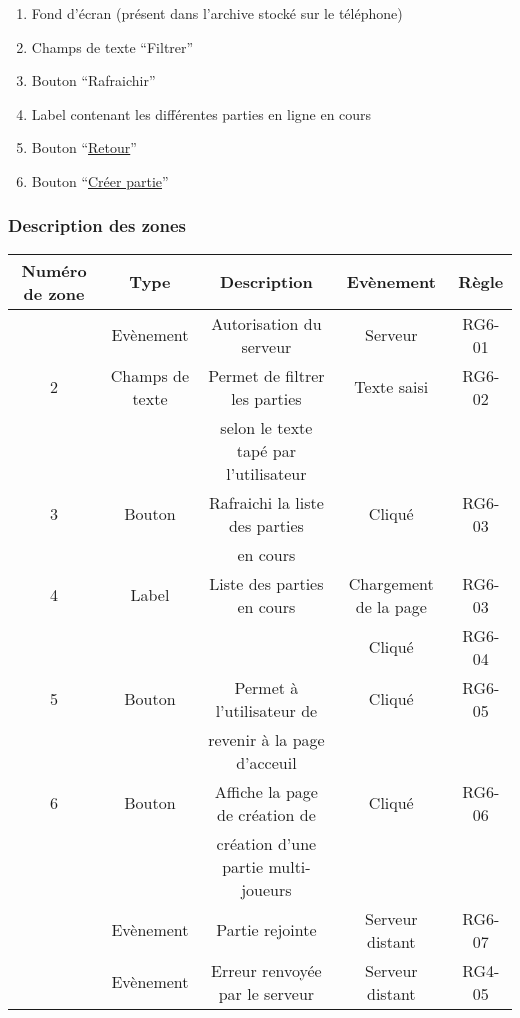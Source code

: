 \documentclass{report}
\begin{document}
		\begin{enumerate}
		  \item Fond d'écran (présent dans l'archive stocké sur le téléphone)
		  \item Champs de texte ``Filtrer''
		  \item Bouton ``Rafraichir''
		  \item Label contenant les différentes parties en ligne en cours
		  \item Bouton ``\hyperlink{Accueil}{Retour}''
		  \item Bouton ``\hyperlink{Creer partie multi-joueurs}{Créer partie}''
		\end{enumerate}

		\subsubsection{Description des zones}

			\begin{tabular}{|c|c|c|c|c|} \hline
				Numéro de zone & Type  & Description & Evènement &	Règle \\\hline
				  & Evènement & Autorisation du serveur & Serveur & RG6-01 \\\hline
				2 & Champs de texte & Permet de filtrer les parties & Texte saisi & RG6-02 \\
				  &                 & selon le texte tapé par l'utilisateur & & \\\hline
				3 & Bouton & Rafraichi la liste des parties & Cliqué & RG6-03 \\
				  &        & en cours & & \\\hline
				4 & Label & Liste des parties en cours & Chargement de la page & RG6-03 \\\
				  &       &                            & Cliqué & RG6-04 \\\hline
				5 & Bouton & Permet à l'utilisateur de & Cliqué & RG6-05 \\
				  &        & revenir à la page d'acceuil & & \\\hline
				6 & Bouton & Affiche la page de création de & Cliqué & RG6-06 \\
				  &        & création d'une partie multi-joueurs & & \\\hline
				  & Evènement & Partie rejointe & Serveur distant & RG6-07 \\\hline
				  & Evènement & Erreur renvoyée par le serveur & Serveur distant & RG4-05 \\\hline
				  
			\end{tabular}
\end{document}
